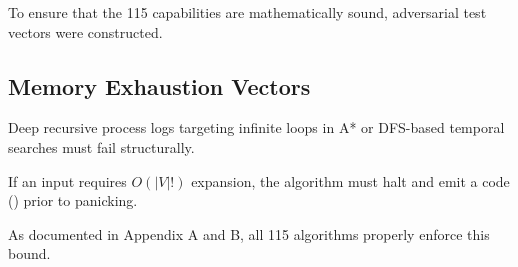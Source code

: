 To ensure that the 115 capabilities are mathematically sound, adversarial test vectors were constructed.

\subsection{Memory Exhaustion Vectors}
Deep recursive process logs targeting infinite loops in A* or DFS-based temporal searches must fail structurally.

\begin{falsifier}
If an input requires $O(|V|!)$ expansion, the algorithm must halt and emit a  code () prior to panicking.
\end{falsifier}

As documented in Appendix A and B, all 115 algorithms properly enforce this bound.
